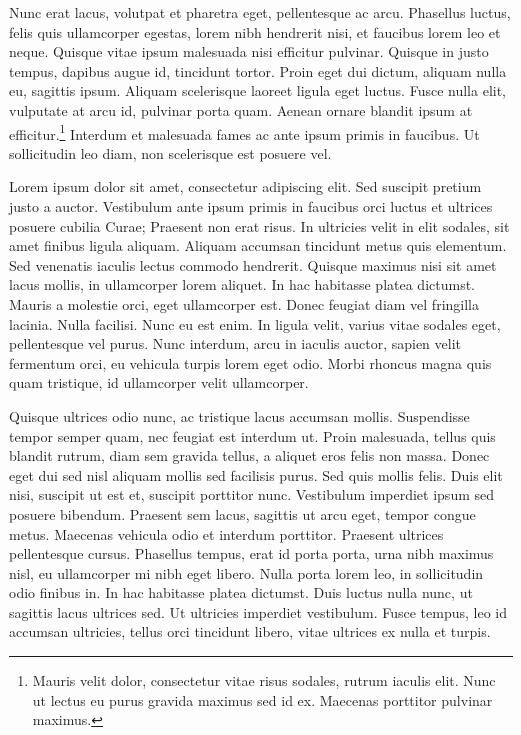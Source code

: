 Nunc erat lacus, volutpat et pharetra eget, pellentesque ac arcu. Phasellus luctus, felis quis ullamcorper egestas, lorem nibh hendrerit nisi, et faucibus lorem leo et neque. Quisque vitae ipsum malesuada nisi efficitur pulvinar. Quisque in justo tempus, dapibus augue id, tincidunt tortor. Proin eget dui dictum, aliquam nulla eu, sagittis ipsum. Aliquam scelerisque laoreet ligula eget luctus. Fusce nulla elit, vulputate at arcu id, pulvinar porta quam. Aenean ornare blandit ipsum at efficitur.\footnote{Mauris velit dolor, consectetur vitae risus sodales, rutrum iaculis elit. Nunc ut lectus eu purus gravida maximus sed id ex. Maecenas porttitor pulvinar maximus.} Interdum et malesuada fames ac ante ipsum primis in faucibus. Ut sollicitudin leo diam, non scelerisque est posuere vel.

Lorem ipsum dolor sit amet, consectetur adipiscing elit. Sed suscipit pretium justo a auctor. Vestibulum ante ipsum primis in faucibus orci luctus et ultrices posuere cubilia Curae; Praesent non erat risus. In ultricies velit in elit sodales, sit amet finibus ligula aliquam. Aliquam accumsan tincidunt metus quis elementum. Sed venenatis iaculis lectus commodo hendrerit. Quisque maximus nisi sit amet lacus mollis, in ullamcorper lorem aliquet. In hac habitasse platea dictumst. Mauris a molestie orci, eget ullamcorper est. Donec feugiat diam vel fringilla lacinia. Nulla facilisi. Nunc eu est enim. In ligula velit, varius vitae sodales eget, pellentesque vel purus. Nunc interdum, arcu in iaculis auctor, sapien velit fermentum orci, eu vehicula turpis lorem eget odio. Morbi rhoncus magna quis quam tristique, id ullamcorper velit ullamcorper.

Quisque ultrices odio nunc, ac tristique lacus accumsan mollis. Suspendisse tempor semper quam, nec feugiat est interdum ut. Proin malesuada, tellus quis blandit rutrum, diam sem gravida tellus, a aliquet eros felis non massa. Donec eget dui sed nisl aliquam mollis sed facilisis purus. Sed quis mollis felis. Duis elit nisi, suscipit ut est et, suscipit porttitor nunc. Vestibulum imperdiet ipsum sed posuere bibendum. Praesent sem lacus, sagittis ut arcu eget, tempor congue metus. Maecenas vehicula odio et interdum porttitor. Praesent ultrices pellentesque cursus. Phasellus tempus, erat id porta porta, urna nibh maximus nisl, eu ullamcorper mi nibh eget libero. Nulla porta lorem leo, in sollicitudin odio finibus in. In hac habitasse platea dictumst. Duis luctus nulla nunc, ut sagittis lacus ultrices sed. Ut ultricies imperdiet vestibulum. Fusce tempus, leo id accumsan ultricies, tellus orci tincidunt libero, vitae ultrices ex nulla et turpis.

